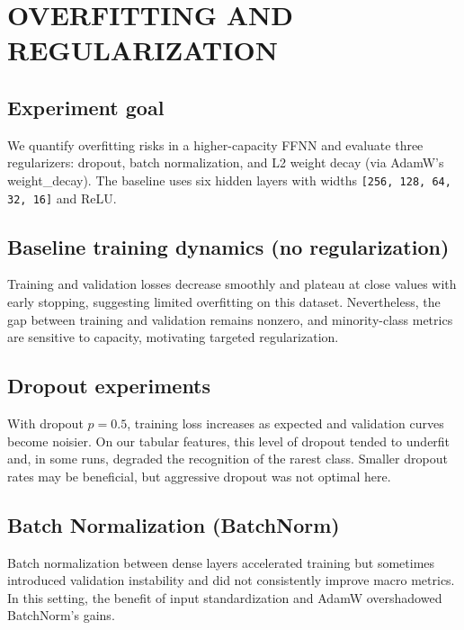 
\section{OVERFITTING AND REGULARIZATION} \label{sec:overfitting-regularization}

    \subsection{Experiment goal}

        We quantify overfitting risks in a higher-capacity FFNN and evaluate three regularizers: dropout, batch normalization, and L2 weight decay (via AdamW's weight\_decay). 
        The baseline uses six hidden layers with widths \texttt{[256, 128, 64, 32, 16]} and ReLU.

    \subsection{Baseline training dynamics (no regularization)}

        Training and validation losses decrease smoothly and plateau at close values with early stopping, suggesting limited overfitting on this dataset. 
        Nevertheless, the gap between training and validation remains nonzero, and minority-class metrics are sensitive to capacity, motivating targeted regularization.

    \subsection{Dropout experiments}

        With dropout $p=0.5$, training loss increases as expected and validation curves become noisier. 
        On our tabular features, this level of dropout tended to underfit and, in some runs, degraded the recognition of the rarest class. 
        Smaller dropout rates may be beneficial, but aggressive dropout was not optimal here.

    \subsection{Batch Normalization (BatchNorm)}

        Batch normalization between dense layers accelerated training but sometimes introduced validation instability and did not consistently improve macro metrics. 
        In this setting, the benefit of input standardization and AdamW overshadowed BatchNorm's gains.


